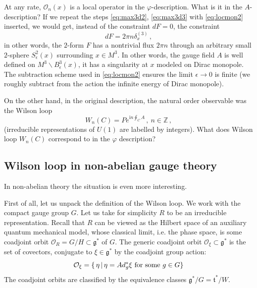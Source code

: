 \documentclass[12pt]{article}
\newcommand{\problemname}{}
\newenvironment{statement}[1]
 {\renewcommand{\problemname}{#1}\problem}
 {\endproblem}
\numberwithin{equation}{section}
\newcommand{\ep}{{\epsilon}}
\newcommand\beq{\begin{equation}}
\newcommand\eeq{\end{equation}}
\theoremstyle{definition}
\newcommand {\BZ}   {\mathbb Z}
\newcommand {\CalO} {\mathcal O}
\newcommand {\fg} {\mathfrak{g}}
\newcommand {\ii} {\mathrm{i}}
\begin{document}
At any rate, $\CalO_{n}(x)$ is a local operator in the $\varphi$-description. What is it in the $A$-description?
If we repeat the steps \eqref{eq:max3d2}, \eqref{eq:max3d3} with \eqref{eq:locmon2}
inserted, we would get, instead of the constraint $dF = 0$, the constraint
\beq
dF = 2\pi n {\delta}^{(3)}_{x}\,  ,
\eeq
in other words, the $2$-form $F$ has a nontrivial flux $2\pi n$ through an arbitrary
small $2$-sphere $S^2_{\ep}(x)$ surrounding $x \in M^3$. In other words, 
the gauge field $A$ is well defined on $M^3 \backslash B^{3}_{\ep}(x)$, it has a singularity at $x$ modeled on Dirac monopole. The subtraction scheme used in
\eqref{eq:locmon2} ensures the limit $\ep \to 0$ is finite (we roughly subtract 
from the action the infinite energy of Dirac monopole). 

On the other hand, in the original description, the natural order observable was the Wilson loop
\beq\label{abwil}
W_{n}(C) = P e^{\ii n \oint_{C}A}\, , \ n \in {\BZ}\,, 
\eeq
(irreducible representations of $U(1)$ are labelled by integers). 
\begin{statement}{Problem 7}\normalfont \label{prob7}
What does Wilson loop $W_{n}(C)$ correspond to in the $\varphi$ description?
\end{statement}

\subsection{Wilson loop in non-abelian gauge theory}
In non-abelian theory the situation is even more interesting. 

First of all, let us unpack the definition of the Wilson loop. We work with the
compact gauge group $G$. Let us take for simplicity $R$ to be an irreducible representation. 
Recall that $R$ can be viewed as the Hilbert space of an auxiliary quantum mechanical model, whose classical limit, i.e. the phase space, is some coadjoint orbit ${\CalO}_{R} = G/H \subset {\fg}^{*}$ of $G$. The generic coadjoint orbit ${\CalO}_{\xi} \subset {\fg}^{*}$
is the set of covectors, conjugate to $\xi \in {\fg}^{*}$ by the coadjoint group action:
\beq
{\CalO}_{\xi} = \{ \, {\eta}\, | \, {\eta} = Ad_{g}^{*}{\xi}\ {\rm for\ some\ } g \in G \}
\eeq
The coadjoint orbits are classified by the equivalence classes ${\fg}^{*}/G = {\mathfrak{t}}^{*}/W$. 
\end{document}
